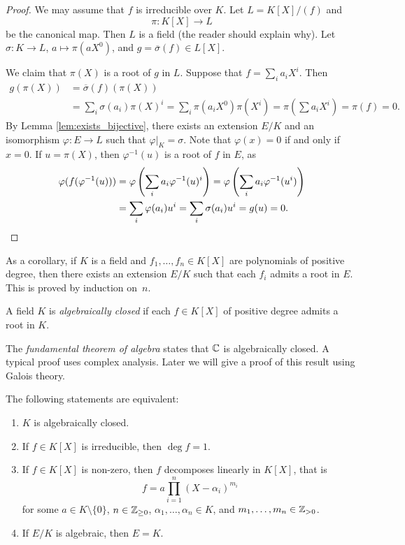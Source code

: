 \begin{proof}
	We may assume that $f$ is irreducible over $K$. Let $L=K[X]/(f)$ and 
	\[
    \pi\colon K[X]\to L
    \]
    be the canonical map. Then $L$ 
	is a field (the reader should explain why). 
	Let $\sigma\colon K\to L$, $a\mapsto \pi(aX^0)$, and 
	$g=\overline{\sigma}(f)\in L[X]$. 

	We claim that $\pi(X)$ is a root of $g$ in $L$. Suppose that $f=\sum_i a_iX^i$. 
	Then 
	\begin{align*}
		g(\pi(X))&=\overline{\sigma}(f)(\pi(X))\\
		&=\sum_i \sigma(a_i)\pi(X)^i
		=\sum_i\pi(a_iX^0)\pi(X^i)=\pi(\sum a_iX^i)=\pi(f)=0.
	\end{align*}
    By Lemma \ref{lem:exists_bijective},  
	there exists an extension $E/K$ and an isomorphism $\varphi\colon E\to L$
	such that $\varphi|_K=\sigma$. Note that
	$\varphi(x)=0$ if and only if $x=0$. If $u=\pi(X)$, then $\varphi^{-1}(u)$ is a root of $f$ in $E$, 
	as 
	\begin{align*}
		\varphi(f(\varphi^{-1}(u)))&=\varphi\left(\sum_ia_i\varphi^{-1}(u)^i\right)
		=\varphi\left(\sum_ia_i\varphi^{-1}(u^i)\right)\\
		&=\sum_i\varphi(a_i)u^i=\sum_i\sigma(a_i)u^i=g(u)=0.\qedhere
	\end{align*}
\end{proof}

As a corollary, if $K$ is a field and $f_1,\dots,f_n\in K[X]$ are polynomials 
of positive degree, then there exists an extension $E/K$  such that 
each $f_i$ admits a root in $E$. This is proved by induction on~$n$.  

\begin{definition}
	A field $K$ is \emph{algebraically closed} if each $f\in K[X]$ 
	of positive degree admits a root in $K$. 
\end{definition}

The \emph{fundamental theorem of algebra} states that $\mathbb{C}$ is algebraically closed. A
typical proof uses complex analysis.  Later we will give a proof of this result
using Galois theory. 

\begin{proposition}
	The following statements are equivalent:
	\begin{enumerate}
		\item $K$ is algebraically closed.
		\item If $f\in K[X]$ is irreducible, then $\deg f=1$.
		\item If $f\in K[X]$ is non-zero, then $f$ decomposes linearly in $K[X]$, that is
			\[
				f=a\prod_{i=1}^n(X-\alpha_i)^{m_i}
			\]
			for some $a\in K\setminus\{0\}$, $n\in\mathbb{Z}_{\geq0}$, $\alpha_1,\dots,\alpha_n\in K$, and $m_1,\dots,m_n\in\mathbb{Z}_{>0}$.
		\item If $E/K$ is algebraic, then $E=K$. 
	\end{enumerate}
\end{proposition}

